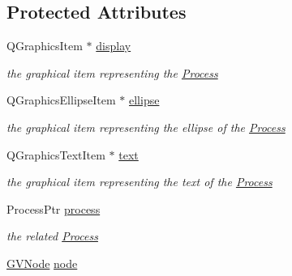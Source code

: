 \subsection*{\-Protected \-Attributes}
\begin{DoxyCompactItemize}
\item 
\hypertarget{class_g_process_afcb6a6765219d5ca69f23b89a147a7db}{\-Q\-Graphics\-Item $\ast$ \hyperlink{class_g_process_afcb6a6765219d5ca69f23b89a147a7db}{display}}\label{class_g_process_afcb6a6765219d5ca69f23b89a147a7db}

\begin{DoxyCompactList}\small\item\em the graphical item representing the \hyperlink{class_process}{\-Process} \end{DoxyCompactList}\item 
\hypertarget{class_g_process_ac0770d84d26f835cd409cb1bbd5a2408}{\-Q\-Graphics\-Ellipse\-Item $\ast$ \hyperlink{class_g_process_ac0770d84d26f835cd409cb1bbd5a2408}{ellipse}}\label{class_g_process_ac0770d84d26f835cd409cb1bbd5a2408}

\begin{DoxyCompactList}\small\item\em the graphical item representing the ellipse of the \hyperlink{class_process}{\-Process} \end{DoxyCompactList}\item 
\hypertarget{class_g_process_a4ff36f4f6daae75d094c53d837ad4ecc}{\-Q\-Graphics\-Text\-Item $\ast$ \hyperlink{class_g_process_a4ff36f4f6daae75d094c53d837ad4ecc}{text}}\label{class_g_process_a4ff36f4f6daae75d094c53d837ad4ecc}

\begin{DoxyCompactList}\small\item\em the graphical item representing the text of the \hyperlink{class_process}{\-Process} \end{DoxyCompactList}\item 
\hypertarget{class_g_process_adb2d4b43a105c00b5be1f5bc405a3f43}{\-Process\-Ptr \hyperlink{class_g_process_adb2d4b43a105c00b5be1f5bc405a3f43}{process}}\label{class_g_process_adb2d4b43a105c00b5be1f5bc405a3f43}

\begin{DoxyCompactList}\small\item\em the related \hyperlink{class_process}{\-Process} \end{DoxyCompactList}\item 
\hypertarget{class_g_process_a83a9972757f06e9eff7fe120ac9f2b5b}{\hyperlink{struct_g_v_node}{\-G\-V\-Node} \hyperlink{class_g_process_a83a9972757f06e9eff7fe120ac9f2b5b}{node}}\label{class_g_process_a83a9972757f06e9eff7fe120ac9f2b5b}


\end{DoxyCompactItemize}
